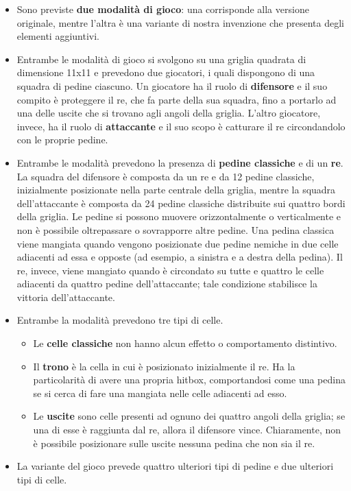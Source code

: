 \documentclass[a4paper,12pt]{report}
\begin{document}
\begin{itemize}
	\item Sono previste \textbf{due modalità di gioco}: una corrisponde alla versione originale, mentre l'altra è una variante di nostra invenzione che presenta degli elementi aggiuntivi.
	\item Entrambe le modalità di gioco si svolgono su una griglia quadrata di dimensione 11x11 e prevedono due giocatori, i quali dispongono di una squadra di pedine ciascuno. Un giocatore ha il ruolo di \textbf{difensore} e il suo compito è proteggere il re, che fa parte della sua squadra, fino a portarlo ad una delle uscite che si trovano agli angoli della griglia. L'altro giocatore, invece, ha il ruolo di \textbf{attaccante} e il suo scopo è catturare il re circondandolo con le proprie pedine.
	\item Entrambe le modalità prevedono la presenza di \textbf{pedine classiche} e di un \textbf{re}. La squadra del difensore è composta da un re e da 12 pedine classiche, inizialmente posizionate nella parte centrale della griglia, mentre la squadra dell'attaccante è composta da 24 pedine classiche distribuite sui quattro bordi della griglia. Le pedine si possono muovere orizzontalmente o verticalmente e non è possibile oltrepassare o sovrapporre altre pedine. Una pedina classica viene mangiata quando vengono posizionate due pedine nemiche in due celle adiacenti ad essa e opposte (ad esempio, a sinistra e a destra della pedina). Il re, invece, viene mangiato quando è circondato su tutte e quattro le celle adiacenti da quattro pedine dell'attaccante; tale condizione stabilisce la vittoria dell'attaccante.
	\item Entrambe la modalità prevedono tre tipi di celle.
	\begin{itemize}
		\item Le \textbf{celle classiche} non hanno alcun effetto o comportamento distintivo.
		\item Il \textbf{trono} è la cella in cui è posizionato inizialmente il re. Ha la particolarità di avere una propria hitbox, comportandosi come una pedina se si cerca di fare una mangiata nelle celle adiacenti ad esso.
		\item Le \textbf{uscite} sono celle presenti ad ognuno dei quattro angoli della griglia; se una di esse è raggiunta dal re, allora il difensore vince. Chiaramente, non è possibile posizionare sulle uscite nessuna pedina che non sia il re.
	\end{itemize}
	\item La variante del gioco prevede quattro ulteriori tipi di pedine e due ulteriori tipi di celle.

\end{itemize}
\end{document}
